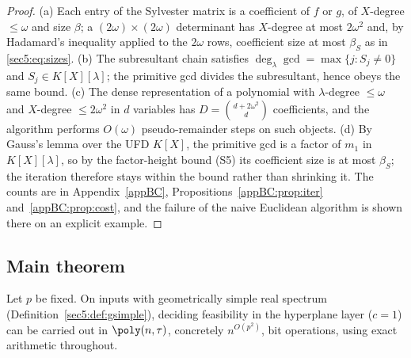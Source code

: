 \begin{proof}
(a) Each entry of the Sylvester matrix is a coefficient of $f$ or $g$, of $X$-degree $\le\omega$ and
size $\beta$; a $(2\omega)\times(2\omega)$ determinant has $X$-degree at most $2\omega^{2}$ and, by
Hadamard's inequality applied to the $2\omega$ rows, coefficient size at most $\beta_S$ as in
\eqref{sec5:eq:sizes}. (b) The subresultant chain satisfies $\deg_\lambda\gcd=\max\{j:S_j\neq0\}$ and
$S_j\in K[X][\lambda]$; the primitive gcd divides the subresultant, hence obeys the same bound. (c) The
dense representation of a polynomial with $\lambda$-degree $\le\omega$ and $X$-degree $\le 2\omega^{2}$
in $d$ variables has $D=\binom{d+2\omega^{2}}{d}$ coefficients, and the algorithm performs $O(\omega)$
pseudo-remainder steps on such objects. (d) By Gauss's lemma over the UFD $K[X]$, the primitive gcd is a
factor of $m_1$ in $K[X][\lambda]$, so by the factor-height bound (S5) its coefficient size is at most
$\beta_S$; the iteration therefore stays within the bound rather than shrinking it. The counts are in
Appendix~\ref{appBC}, Propositions~\ref{appBC:prop:iter} and~\ref{appBC:prop:cost}, and the failure of
the naive Euclidean algorithm is shown there on an explicit example.
\end{proof}

\subsection{Main theorem}\label{sec5:sub:main}

\begin{thm}\label{sec5:thm:poly}
Let $p$ be fixed. On inputs with geometrically simple real spectrum
(Definition~\ref{sec5:def:gsimple}), deciding feasibility in the hyperplane layer ($c=1$) can be
carried out in $\poly(n,\tau)$, concretely $n^{O(p^{2})}$, bit operations, using exact arithmetic
throughout.
\end{thm}

